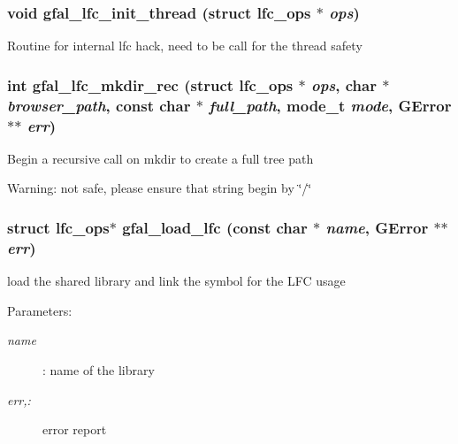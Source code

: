 \subsubsection{\setlength{\rightskip}{0pt plus 5cm}void gfal\_\-lfc\_\-init\_\-thread (struct lfc\_\-ops $\ast$ {\em ops})}\label{lfc__ifce__ng_8c_aed5d8ab4c88e918990444e53930bfa4}


Routine for internal lfc hack, need to be call for the thread safety 
\subsubsection{\setlength{\rightskip}{0pt plus 5cm}int gfal\_\-lfc\_\-mkdir\_\-rec (struct lfc\_\-ops $\ast$ {\em ops}, char $\ast$ {\em browser\_\-path}, const char $\ast$ {\em full\_\-path}, mode\_\-t {\em mode}, GError $\ast$$\ast$ {\em err})}\label{lfc__ifce__ng_8c_0d7c361d951ac79fee504d5125485033}


Begin a recursive call on mkdir to create a full tree path \begin{Desc}
\item[Warning:]not safe, please ensure that string begin by \char`\"{}/\char`\"{} \end{Desc}
\subsubsection{\setlength{\rightskip}{0pt plus 5cm}struct lfc\_\-ops$\ast$ gfal\_\-load\_\-lfc (const char $\ast$ {\em name}, GError $\ast$$\ast$ {\em err})}\label{lfc__ifce__ng_8c_7c91643749a2c5d7e8043c0e42d00fd6}


load the shared library and link the symbol for the LFC usage \begin{Desc}
\item[Parameters:]
\begin{description}
\item[{\em name}]: name of the library \item[{\em err,:}]error report \end{description}
\end{Desc}
